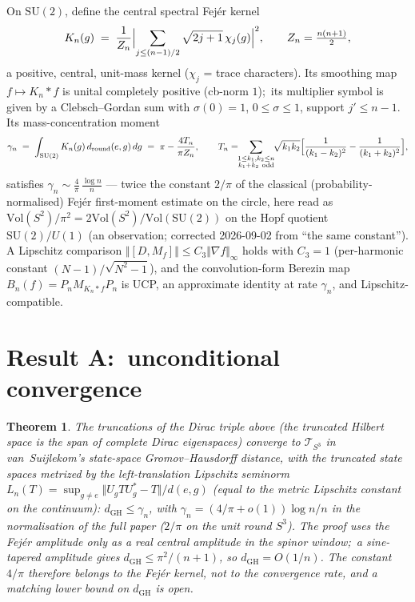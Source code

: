 \documentclass[11pt]{article}
\newtheorem{theorem}{Theorem}
\theoremstyle{remark}
\newcommand{\opnorm}[1]{\Vert #1 \Vert}
\newcommand{\norm}[1]{\Vert #1 \Vert}
\newcommand{\DCH}{D}
\begin{document}
On $\mathrm{SU}(2)$, define the central spectral Fej\'er kernel
\begin{equation}
  K_n(g) \;=\; \frac{1}{Z_n}\Bigl|\sum_{j \le (n-1)/2}
  \sqrt{2j+1}\,\chi_j(g)\Bigr|^2, \qquad Z_n = \tfrac{n(n+1)}{2},
\end{equation}
a positive, central, unit-mass kernel ($\chi_j$ = trace characters).
Its smoothing map $f \mapsto K_n * f$ is unital completely positive
(cb-norm $1$);\ its multiplier symbol is given by a Clebsch--Gordan
sum with $\sigma(0) = 1$, $0 \le \sigma \le 1$, support
$j' \le n - 1$. Its mass-concentration moment
\begin{equation}
  \gamma_n \;=\; \int_{\mathrm{SU}(2)} K_n(g)\,
  d_{\mathrm{round}}(e, g)\,dg
  \;=\; \pi - \frac{4 T_n}{\pi Z_n}, \qquad
  T_n = \!\!\sum_{\substack{1 \le k_1, k_2 \le n \\ k_1 + k_2\
  \mathrm{odd}}}\!\! \sqrt{k_1 k_2}\Bigl[\frac{1}{(k_1 - k_2)^2}
  - \frac{1}{(k_1 + k_2)^2}\Bigr],
\end{equation}
satisfies $\gamma_n \sim \frac{4}{\pi}\,\frac{\log n}{n}$ --- twice
the constant $2/\pi$ of the classical (probability-normalised) Fej\'er
first-moment estimate on the circle, here read as
$\mathrm{Vol}(S^2)/\pi^2 = 2\mathrm{Vol}(S^2)/\mathrm{Vol}(\mathrm{SU}(2))$
on the Hopf quotient $\mathrm{SU}(2)/U(1)$ (an observation; corrected
2026-09-02 from ``the same constant''). A Lipschitz comparison
$\opnorm{[\DCH, M_f]} \le C_3 \norm{\nabla f}_\infty$ holds with
$C_3 = 1$ (per-harmonic constant $(N-1)/\sqrt{N^2-1}$), and the
convolution-form Berezin map
$B_n(f) = P_n M_{K_n * f} P_n$ is UCP, an approximate identity at
rate $\gamma_n$, and Lipschitz-compatible.

\section{Result A:\ unconditional convergence}

\begin{theorem}
The truncations of the Dirac triple above (the truncated Hilbert space
is the span of complete Dirac eigenspaces) converge
to $\mathcal{T}_{S^3}$ in van~Suijlekom's state-space
Gromov--Hausdorff distance, with the truncated state spaces metrized
by the left-translation Lipschitz seminorm
$L_n(T) = \sup_{g \ne e} \norm{U_g T U_g^* - T} / d(e, g)$ (equal to
the metric Lipschitz constant on the continuum):
$d_{\mathrm{GH}} \le \gamma_n$, with
$\gamma_n = (4/\pi + o(1)) \log n / n$ in the normalisation of the full
paper ($2/\pi$ on the unit round $S^3$). The proof uses the Fej\'er
amplitude only as a real central amplitude in the spinor window;\ a
sine-tapered amplitude gives $d_{\mathrm{GH}} \le \pi^2/(n+1)$, so
$d_{\mathrm{GH}} = O(1/n)$. The constant $4/\pi$ therefore belongs to
the Fej\'er kernel, not to the convergence rate, and a matching lower
bound on $d_{\mathrm{GH}}$ is open.
\end{theorem}
\end{document}
